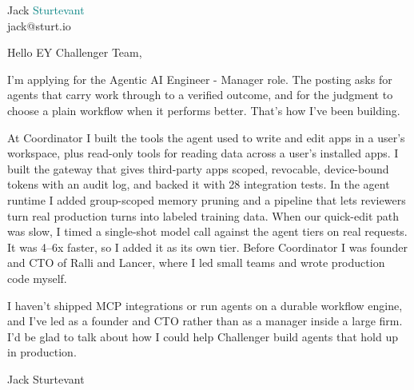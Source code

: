 \documentclass[11pt]{article}
\begin{document}
\raggedright

{\namefont\fontsize{20pt}{24pt}\selectfont Jack \textcolor{teal}{Sturtevant}}\\[-0.3em]
jack@sturt.io

\vspace{1.2em}

Hello EY Challenger Team,

I'm applying for the Agentic AI Engineer - Manager role. The posting asks for agents that carry work through to a verified outcome, and for the judgment to choose a plain workflow when it performs better. That's how I've been building.

At Coordinator I built the tools the agent used to write and edit apps in a user's workspace, plus read-only tools for reading data across a user's installed apps. I built the gateway that gives third-party apps scoped, revocable, device-bound tokens with an audit log, and backed it with 28 integration tests. In the agent runtime I added group-scoped memory pruning and a pipeline that lets reviewers turn real production turns into labeled training data. When our quick-edit path was slow, I timed a single-shot model call against the agent tiers on real requests. It was 4--6x faster, so I added it as its own tier. Before Coordinator I was founder and CTO of Ralli and Lancer, where I led small teams and wrote production code myself.

I haven't shipped MCP integrations or run agents on a durable workflow engine, and I've led as a founder and CTO rather than as a manager inside a large firm. I'd be glad to talk about how I could help Challenger build agents that hold up in production.

\vspace{0.6em}
Jack Sturtevant
\end{document}
